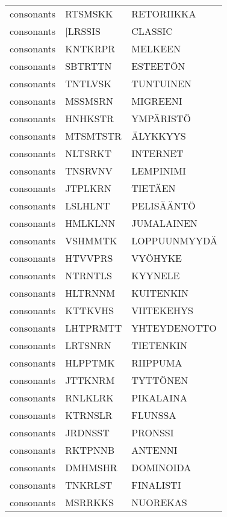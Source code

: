 \begin{tabular}{lll}
 consonants &   RTSMSKK &         RETORIIKKA \\
 consonants &   [LRSSIS &            CLASSIC \\
 consonants &   KNTKRPR &            MELKEEN \\
 consonants &   SBTRTTN &           ESTEETÖN \\
 consonants &   TNTLVSK &          TUNTUINEN \\
 consonants &   MSSMSRN &           MIGREENI \\
 consonants &   HNHKSTR &          YMPÄRISTÖ \\
 consonants &  MTSMTSTR &           ÄLYKKYYS \\
 consonants &   NLTSRKT &           INTERNET \\
 consonants &   TNSRVNV &          LEMPINIMI \\
 consonants &   JTPLKRN &            TIETÄEN \\
 consonants &   LSLHLNT &         PELISÄÄNTÖ \\
 consonants &   HMLKLNN &         JUMALAINEN \\
 consonants &   VSHMMTK &       LOPPUUNMYYDÄ \\
 consonants &   HTVVPRS &            VYÖHYKE \\
 consonants &   NTRNTLS &            KYYNELE \\
 consonants &   HLTRNNM &          KUITENKIN \\
 consonants &   KTTKVHS &         VIITEKEHYS \\
 consonants &  LHTPRMTT &       YHTEYDENOTTO \\
 consonants &   LRTSNRN &          TIETENKIN \\
 consonants &   HLPPTMK &           RIIPPUMA \\
 consonants &   JTTKNRM &           TYTTÖNEN \\
 consonants &   RNLKLRK &          PIKALAINA \\
 consonants &   KTRNSLR &            FLUNSSA \\
 consonants &   JRDNSST &            PRONSSI \\
 consonants &   RKTPNNB &            ANTENNI \\
 consonants &   DMHMSHR &          DOMINOIDA \\
 consonants &   TNKRLST &          FINALISTI \\
 consonants &   MSRRKKS &           NUOREKAS \\
\bottomrule
\end{tabular}
